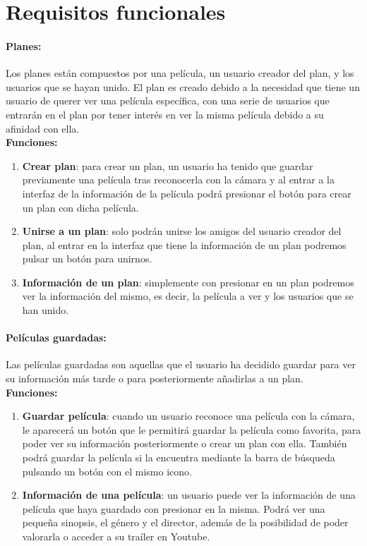 \section{Requisitos funcionales}
\label{makereference3.3}

\paragraph{\large Planes:\\}

Los planes están compuestos por una película, un usuario creador del plan, y los usuarios que se hayan unido. El plan
es creado debido a la necesidad que tiene un usuario de querer ver una película específica, con una serie de usuarios que 
entrarán en el plan por tener interés en ver la misma película debido a su afinidad con ella.
\\
\textbf{Funciones:}
\begin{enumerate}
    \item \textbf{Crear plan}: para crear un plan, un usuario ha tenido que guardar previamente una película tras reconocerla con la cámara y al entrar a la interfaz de la información de la película podrá presionar el botón para crear un plan con dicha película.
    \item \textbf{Unirse a un plan}: solo podrán unirse los amigos del usuario creador del plan, al entrar en la interfaz que tiene la información de un plan podremos pulsar un botón para unirnos.
    \item \textbf{Información de un plan}: simplemente con presionar en un plan podremos ver la información del mismo, es decir, la película a ver y los usuarios que se han unido.
\end{enumerate}
\newpage
\paragraph{\large Películas guardadas:\\}

Las películas guardadas son aquellas que el usuario ha decidido guardar para ver su información más tarde o para posteriormente añadirlas a un plan.
\\
\textbf{Funciones:}
\begin{enumerate}
    \item \textbf{Guardar película}: cuando un usuario reconoce una película con la cámara, le aparecerá un botón que le permitirá guardar la película como favorita, para poder ver su información posteriormente o crear un plan con ella. También podrá guardar la película si la encuentra mediante la barra de búsqueda pulsando un botón con el mismo icono.
    \item \textbf{Información de una película}: un usuario puede ver la información de una película que haya guardado con presionar en la misma. Podrá ver una pequeña sinopsis, el género y el director, además de la posibilidad de poder valorarla o acceder a su traíler en Youtube.
\end{enumerate} 

